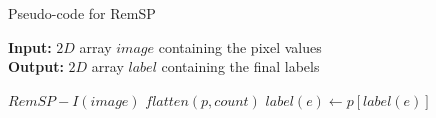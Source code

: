 \begin{algorithm}[H]
\small
{
	\caption{Pseudo-code for RemSP}
	\label{alg:RemSP}
	\textbf{Input:} $2D$ array $image$ containing the pixel values \\
	\textbf{Output:} $2D$ array $label$ containing the final labels
	\begin{algorithmic}[1]
		\State $RemSP-I(image)$ 
		\State $flatten(p,count)$ 
		  
				\State $label(e) \gets p[label(e)]$
			\EndFor
		\EndFor
	\EndFunction
	\end{algorithmic}
}	
\end{algorithm}

